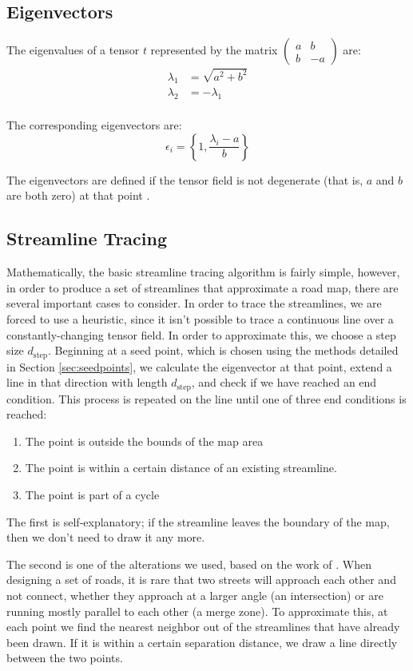 \documentclass[twocolumn]{article}
\newcommand{\sqmat}[4]{\ensuremath{
    \left(\begin{array}{cc}
        #1 & #2 \\
        #3 & #4
    \end{array}\right)}}
\begin{document}
\subsection{Eigenvectors}\label{sec:eigenvectors}
The eigenvalues of a tensor $t$ represented by the matrix $\sqmat{a}{b}{b}{-a}$
are:
\begin{align}
    \lambda_1 &= \sqrt{a^2+b^2} \\
    \lambda_2 &= -\lambda_1 \\
\end{align}

The corresponding eigenvectors are:
\[
    \epsilon_i = \left\{1,\frac{\lambda_i-a}{b}\right\}
\]

The eigenvectors are defined if the tensor field is not degenerate (that is,
$a$ and $b$ are both zero) at that point \cite{find-evs}.

\subsection{Streamline Tracing}
Mathematically, the basic streamline tracing algorithm is fairly simple,
however, in order to produce a set of streamlines that approximate a road map,
there are several important cases to consider. In order to trace the
streamlines, we are forced to use a heuristic, since it isn’t possible to trace
a continuous line over a constantly-changing tensor field. In order to
approximate this, we choose a step size $d_\textrm{step}$. Beginning at a seed
point, which is chosen using the methods detailed in Section
\ref{sec:seedpoints}, we calculate the eigenvector at that point, extend a line
in that direction with length $d_\textrm{step}$, and check if we have reached
an end condition.  This process is repeated on the line until one of three end
conditions is reached:

\begin{enumerate}
    \item The point is outside the bounds of the map area
    \item The point is within a certain distance of an existing streamline.
    \item The point is part of a cycle
\end{enumerate}

The first is self-explanatory; if the streamline leaves the boundary of the
map, then we don’t need to draw it any more.

The second is one of the alterations we used, based on the work of \cite{chen}.
When designing a set of roads, it is rare that two streets will approach each
other and not connect, whether they approach at a larger angle (an
intersection) or are running mostly parallel to each other (a merge zone). To
approximate this, at each point we find the nearest neighbor out of the
streamlines that have already been drawn.  If it is within a certain separation
distance, we draw a line directly between the two points.
\end{document}
